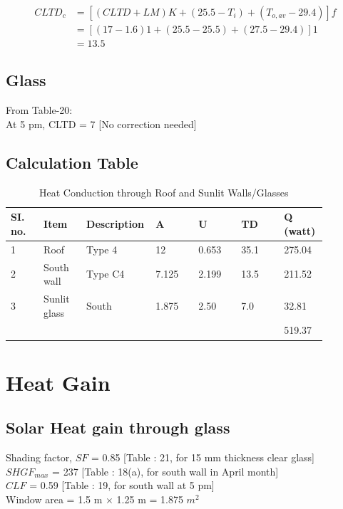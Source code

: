 \documentclass{article}
\begin{document}
    \begin{align*}
      CLTD_c &= \left[(CLTD + LM)K + (25.5 - T_i) + (T_{o,av} - 29.4)\right] f \\
      &= \left[(17 - 1.6)1 + (25.5 - 25.5) + (27.5 - 29.4)\right] 1 \\
      &= 13.5
    \end{align*}

    \subsection{Glass}
    From Table-20: \\
    At 5 pm, CLTD = 7  [No correction needed]\\

    \subsection{Calculation Table}
    \begin{table}[ht]
      \centering
      \begin{tabularx}{\linewidth}{p{0.10\linewidth} p{0.13\linewidth} p{0.13\linewidth} p{0.13\linewidth} p{0.13\linewidth} p{0.13\linewidth} p{0.13\linewidth}}
          \hline
          SI. no. & Item & Description & A & U & TD & Q (watt) \\
          \hline
          1 & Roof & Type 4 & 12 & 0.653 & 35.1 & 275.04 \\
          2 & South wall & Type C4 & 7.125 & 2.199 & 13.5 & 211.52 \\
          3 & Sunlit glass & South & 1.875 & 2.50 & 7.0 & 32.81 \\
          \hline
          &&&&&& 519.37 \\
          \hline
      \end{tabularx}
      \caption{Heat Conduction through Roof and Sunlit Walls/Glasses}
      \label{tab:Heat-Conduction-Roof-Sunlit-Walls-Glasses}
    \end{table}
    \vspace*{1cm}

    \section{Heat Gain}
    \subsection{Solar Heat gain through glass}
    Shading factor, $SF$ = 0.85 [Table : 21, for 15 mm thickness clear glass] \\
    $SHGF_{max}$ = 237 [Table : 18(a), for south wall in April month] \\
    $CLF$ = 0.59 [Table : 19, for south wall at 5 pm] \\ 
    Window area = 1.5 m $\times$ 1.25 m = 1.875 $m^2$ \\
\end{document}
